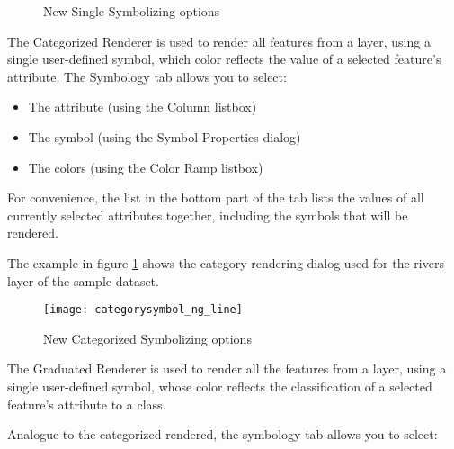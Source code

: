 \begin{figure}[ht]
\centering
   \hspace{1cm}
   \hspace{1cm}
\caption{New Single Symbolizing options \nixcaption}
\end{figure}


The Categorized Renderer is used to render all features from a layer, using a
single user-defined symbol, which color reflects the value of a selected
feature's attribute. The Symbology tab allows you to select:

\begin{itemize}[label=--]
\item The attribute (using the Column listbox)
\item The symbol (using the Symbol Properties dialog)
\item The colors (using the Color Ramp listbox)
\end{itemize}

For convenience, the list in the bottom part of the tab lists the values of
all currently selected attributes together, including the symbols that will
be rendered.

The example in figure \ref{fig:catsymNG} shows the category rendering dialog
used for the rivers layer of the \qg sample dataset.

\begin{figure}[ht]
   \centering
   \caption{New Categorized Symbolizing options \nixcaption}\label{fig:catsymNG}
   \texttt{[image: categorysymbol\_ng\_line]}
\end{figure}


The Graduated Renderer is used to render all the features from a layer, using
a single user-defined symbol, whose color reflects the classification of a selected
feature's attribute to a class.

Analogue to the categorized rendered, the symbology tab allows you to select:

